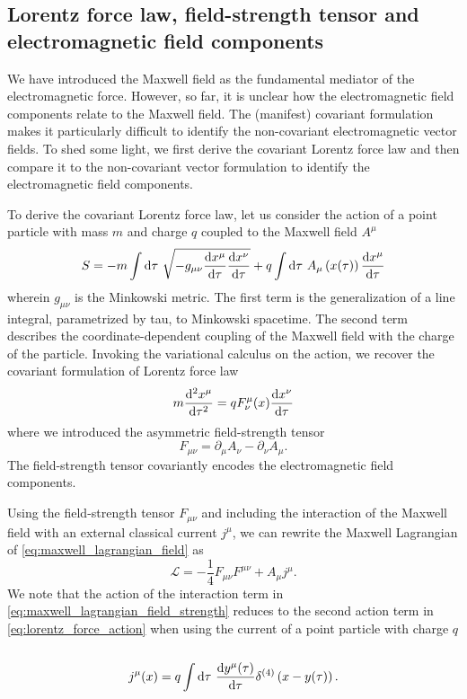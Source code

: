 \subsection{Lorentz force law, field-strength tensor and electromagnetic field components}

We have introduced the Maxwell field as the fundamental mediator of the electromagnetic force.
However, so far, it is unclear how the electromagnetic field components relate to the Maxwell field.
The (manifest) covariant formulation makes it particularly difficult to identify the non-covariant electromagnetic vector fields.
To shed some light, we first derive the covariant Lorentz force law and then compare it to the non-covariant vector formulation to identify the electromagnetic field components.

To derive the covariant Lorentz force law, let us consider the action of a point particle with mass $m$ and charge $q$ coupled to the Maxwell field $A^\mu$~\cite[p.~244]{Zee2013}
\begin{equation}
	S
	=
	-
	m\int\dd{\tau}
	\sqrt{-g_{\mu\nu}\odv{x^\mu}{\tau}\odv{x^\nu}{\tau}}
	+
	q\int\dd{\tau}
	A_\mu\left(x(\tau)\right)
	\odv{x^\mu}{\tau}
	\label{eq:lorentz_force_action}
\end{equation}
wherein $g_{\mu\nu}$ is the Minkowski metric.
The first term is the generalization of a line integral, parametrized by tau, to Minkowski spacetime.
The second term describes the coordinate-dependent coupling of the Maxwell field with the charge of the particle.
Invoking the variational calculus on the action, we recover the covariant formulation of Lorentz force law
\begin{equation}
	m
	\odv[order={2}]{x^\mu}{\tau}
	=
	qF^\mu_\nu(x)\odv{x^\nu}{\tau}
	\label{eq:covariant_lorentz_force}
\end{equation}
where we introduced the asymmetric field-strength tensor
\begin{equation}
	F_{\mu\nu}
	=
	\partial_\mu
	A_\nu
	-
	\partial_\nu
	A_\mu
	\label{eq:field_strength_tensor}
	.
\end{equation}
The field-strength tensor covariantly encodes the electromagnetic field components.

Using the field-strength tensor $F_{\mu\nu}$ and including the interaction of the Maxwell field with an external classical current $j^\mu$, we can rewrite the Maxwell Lagrangian of \cref{eq:maxwell_lagrangian_field} as
\begin{equation}
	\mathcal{L}
	=
	-
	\frac{1}{4}
	F_{\mu\nu}
	F^{\mu\nu}
	+
	A_\mu j^\mu
	\label{eq:maxwell_lagrangian_field_strength}
	.
\end{equation}
We note that the action of the interaction term in \cref{eq:maxwell_lagrangian_field_strength} reduces to the second action term in \cref{eq:lorentz_force_action} when using the current of a point particle with charge $q$~\cite[p.~177]{Peskin1995}
\begin{equation}
	j^\mu(x)
	=
	q
	\int\dd{\tau}
	\odv{y^\mu(\tau)}{\tau}
	\delta^{(4)}\left(x-y(\tau)\right)
	.
\end{equation}


